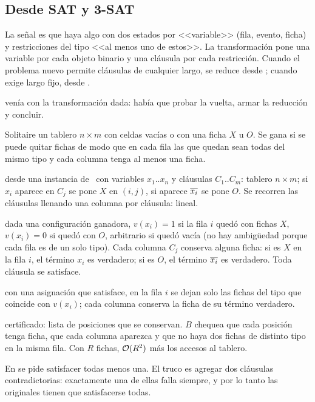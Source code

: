 \subsection{Desde SAT y 3-SAT}

La señal es que haya algo con dos estados por <<variable>> (fila, evento, ficha) y restricciones del tipo <<al menos uno de estos>>. La transformación pone una variable por cada objeto binario y una cláusula por cada restricción. Cuando el problema nuevo permite cláusulas de cualquier largo, se reduce desde \npSAT; cuando exige largo fijo, desde \npTSAT.

 venía con la transformación dada: había que probar la vuelta, armar la reducción y concluir.

\begin{problema}{Solitaire}
 un tablero $n\times m$ con celdas vacías o con una ficha $X$ u $O$. Se gana si se puede quitar fichas de modo que en cada fila las que quedan sean todas del mismo tipo y cada columna tenga al menos una ficha.

 desde una instancia de \npTSAT\ con variables $x_1..x_n$ y cláusulas $C_1..C_m$: tablero $n\times m$; si $x_i$ aparece en $C_j$ se pone $X$ en $(i,j)$, si aparece $\overline{x_i}$ se pone $O$. Se recorren las cláusulas llenando una columna por cláusula: lineal.

 dada una configuración ganadora, $v(x_i)=1$ si la fila $i$ quedó con fichas $X$, $v(x_i)=0$ si quedó con $O$, arbitrario si quedó vacía (no hay ambigüedad porque cada fila es de un solo tipo). Cada columna $C_j$ conserva alguna ficha: si es $X$ en la fila $i$, el término $x_i$ es verdadero; si es $O$, el término $\overline{x_i}$ es verdadero. Toda cláusula se satisface.

 con una asignación que satisface, en la fila $i$ se dejan solo las fichas del tipo que coincide con $v(x_i)$; cada columna conserva la ficha de su término verdadero.

 certificado: lista de posiciones que se conservan. $B$ chequea que cada posición tenga ficha, que cada columna aparezca y que no haya dos fichas de distinto tipo en la misma fila. Con $R$ fichas, $\mathcal{O}(R^2)$ más los accesos al tablero.
\end{problema}

En  se pide satisfacer todas menos una. El truco es agregar dos cláusulas contradictorias: exactamente una de ellas falla siempre, y por lo tanto las originales tienen que satisfacerse todas.

